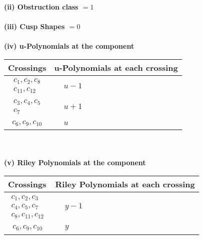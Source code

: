 \documentclass[1p]{elsarticle_modified}
\theoremstyle{definition}
\begin{document}
\flushleft \textbf{(ii) Obstruction class $= 1$}\\~\\
\flushleft \textbf{(iii) Cusp Shapes $= 0$}\\~\\
\newpage\renewcommand{\arraystretch}{1}
\flushleft \textbf{(iv) u-Polynomials at the component}\newline \\
\begin{tabular}{m{50pt}|m{274pt}}
Crossings & \hspace{64pt}u-Polynomials at each crossing \\
\hline $$\begin{aligned}c_{1},c_{2},c_{8}\\c_{11},c_{12}\end{aligned}$$&$\begin{aligned}
&u-1
\end{aligned}$\\
\hline $$\begin{aligned}c_{3},c_{4},c_{5}\\c_{7}\end{aligned}$$&$\begin{aligned}
&u+1
\end{aligned}$\\
\hline $$\begin{aligned}c_{6},c_{9},c_{10}\end{aligned}$$&$\begin{aligned}
&u
\end{aligned}$\\
\hline
\end{tabular}\\~\\
\newpage\renewcommand{\arraystretch}{1}
\flushleft \textbf{(v) Riley Polynomials at the component}\newline \\
\begin{tabular}{m{50pt}|m{274pt}}
Crossings & \hspace{64pt}Riley Polynomials at each crossing \\
\hline $$\begin{aligned}c_{1},c_{2},c_{3}\\c_{4},c_{5},c_{7}\\c_{8},c_{11},c_{12}\end{aligned}$$&$\begin{aligned}
&y-1
\end{aligned}$\\
\hline $$\begin{aligned}c_{6},c_{9},c_{10}\end{aligned}$$&$\begin{aligned}
&y
\end{aligned}$\\
\hline
\end{tabular}\\~\\
\end{document}
